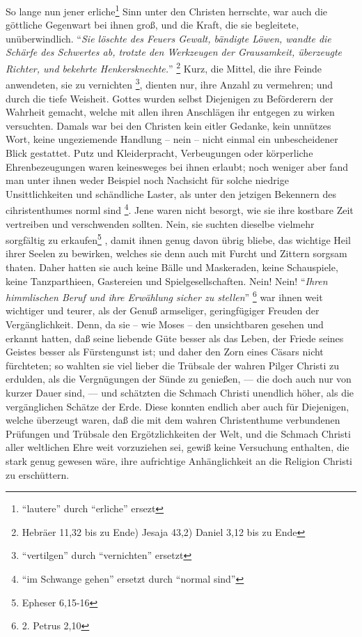 \medskip

So lange nun jener erliche\footnote{"`lautere"' durch "`erliche"' ersezt}
Sinn unter den Christen herrschte, war auch die
göttliche Gegenwart bei ihnen groß, und die Kraft, die sie begleitete,
unüberwindlich. "`\textit{Sie löschte des Feuers Gewalt, bändigte Löwen,
wandte die Schärfe des Schwertes ab, trotzte den Werkzeugen der Grausamkeit,
überzeugte Richter, und bekehrte Henkersknechte.}"'
\footnote{Hebräer 11,32 bis zu Ende) Jesaja 43,2) Daniel 3,12 bis zu Ende}
 
Kurz, die Mittel, die ihre Feinde anwendeten, sie
zu vernichten \footnote{"`vertilgen"' durch "`vernichten"' ersetzt}, dienten
nur, ihre Anzahl zu vermehren; und durch die tiefe
Weisheit. Gottes wurden selbst Diejenigen zu Beförderern der Wahrheit gemacht,
welche mit allen ihren Anschlägen ihr entgegen zu wirken versuchten. Damals war
bei den Christen kein eitler Gedanke, kein unnützes Wort, keine ungeziemende
Handlung -- nein -- nicht einmal ein unbescheidener Blick gestattet. Putz und
Kleiderpracht, Verbeugungen oder körperliche Ehrenbezeugungen waren keinesweges
bei ihnen erlaubt; noch weniger aber fand man unter ihnen weder Beispiel noch
Nachsicht für solche niedrige Unsittlichkeiten und schändliche Laster, als unter
den jetzigen Bekennern des cihristenthumes norml sind
\footnote{"`im Schwange gehen"' ersetzt durch "`normal sind"'}. Jene waren nicht
besorgt, wie sie ihre kostbare Zeit vertreiben und verschwenden sollten. Nein,
sie suchten dieselbe vielmehr sorgfältig zu erkaufen\footnote{Epheser 6,15-16}
,
damit ihnen genug davon übrig bliebe, das wichtige Heil ihrer Seelen zu
bewirken, welches sie denn auch mit Furcht und Zittern sorgsam thaten. Daher
hatten sie auch keine Bälle und Maskeraden, keine Schauspiele, keine
Tanzparthieen, Gastereien und Spielgesellschaften. Nein! Nein!
"`\textit{Ihren himmlischen Beruf und ihre Erwählung sicher zu stellen}"' \footnote{2. Petrus 2,10} 
war ihnen weit wichtiger und teurer, als der Genuß armseliger, geringfügiger
Freuden der Vergänglichkeit. Denn, da sie -- wie Moses -- den unsichtbaren
gesehen und erkannt hatten, daß seine liebende Güte besser als das Leben,
der Friede seines Geistes besser als Fürstengunst ist; und daher den Zorn eines
Cäsars  nicht fürchteten; so wahlten sie viel lieber die Trübsale
der wahren Pilger  Christi zu erdulden, als die Vergnügungen der
Sünde zu genießen, — die doch auch nur von kurzer Dauer sind, — und schätzten
die Schmach Christi unendlich höher, als die vergänglichen Schätze der Erde.
Diese konnten endlich aber auch für Diejenigen, welche überzeugt waren, daß
die mit dem wahren Christenthume verbundenen Prüfungen und Trübsale den
Ergötzlichkeiten der Welt, und die Schmach Christi aller weltlichen Ehre weit
vorzuziehen sei, gewiß keine Versuchung enthalten, die stark genug gewesen wäre,
ihre aufrichtige Anhänglichkeit an die Religion Christi zu erschüttern.

